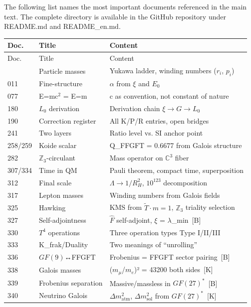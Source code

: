 \documentclass[11pt,oneside]{book}
\newcommand{\status}[1]{\penalty10000\,{\scriptsize\textcolor{gray!60}{[#1]}}}
\begin{document}
The following list names the most important documents referenced in the main
text. The complete directory is available in the GitHub repository under
README.md and README\_en.md.

\begin{longtable}{lp{3.2cm}p{5.0cm}}
\toprule
Doc. & Title & Content \\
\midrule
\endfirsthead
\toprule
Doc. & Title & Content \\
\midrule
\endhead
\bottomrule
\endfoot
006 & Particle masses & Yukawa ladder, winding numbers ($r_i$, $p_i$) \\
011 & Fine-structure & $\alpha$ from $\xi$ and $E_0$ \\
077 & E=mc$^2$ = E=m & c as convention, not constant of nature \\
180 & $L_0$ derivation & Derivation chain $\xi \to G \to L_0$ \\
190 & Correction register & All K/P/R entries, open bridges \\
241 & Two layers & Ratio level vs. SI anchor point \\
258/259 & Koide scalar & Q\_FFGFT = 0.6677 from Galois structure \\
282 & $\mathbb{Z}_3$-circulant & Mass operator on $\mathbb{C}^3$ fiber \\
307/334 & Time in QM & Pauli theorem, compact time, superposition \\
312 & Final scale & $\Lambda \to 1/R_H^2$, $10^{123}$ decomposition \\
317 & Lepton masses & Winding numbers from Galois fields \\
325 & Hawking & KMS from $\tilde{T}\cdot m=1$, $\mathbb{Z}_3$ triality selection \\
327 & Self-adjointness & $\hat{F}$ self-adjoint, $\xi$ = $\lambda$\_min \status{B} \\
330 & $T^4$ operations & Three operation types Type I/II/III \\
333 & K\_frak/Duality & Two meanings of \enquote{unrolling} \\
336 & $GF(9)$↔FFGFT & Frobenius = FFGFT sector pairing \status{B} \\
338 & Galois masses & ($m_\mu$/$m_e$)² = 43200 both sides \status{K} \\
339 & Frobenius separation & Massive/massless in $GF(27)^*$ \status{B} \\
340 & Neutrino Galois & $\Delta m^2_\text{atm}$, $\Delta m^2_\text{sol}$ from $GF(27)^*$ \status{K} \\

\end{longtable}
\end{document}
